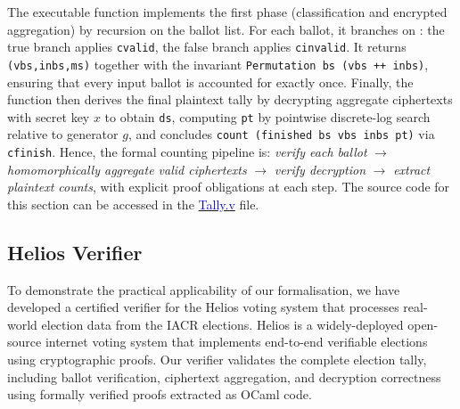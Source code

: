 \documentclass[sigconf,anonymous,review]{acmart}
\begin{document}
The executable function \texttt{} implements the first phase (classification and encrypted aggregation) by recursion on the ballot list. For each ballot, it branches on \texttt{}: the true branch applies \texttt{cvalid}, the false branch applies \texttt{cinvalid}. It returns \texttt{(vbs,inbs,ms)} together with the invariant \texttt{Permutation bs (vbs ++ inbs)}, ensuring that every input ballot is accounted for exactly once. Finally, the function \texttt{} then derives the final plaintext tally by decrypting aggregate ciphertexts with secret key $x$ to obtain \texttt{ds}, computing \texttt{pt} by pointwise discrete-log search relative to generator $g$, and concludes \texttt{count (finished bs vbs inbs pt)} via \texttt{cfinish}. Hence, the formal counting pipeline is: \emph{verify each ballot} $\to$ \emph{homomorphically aggregate valid ciphertexts} $\to$ \emph{verify decryption} $\to$ \emph{extract plaintext counts}, with explicit proof obligations at each step. The source code for this section can be accessed in the \href{https://anonymous.4open.science/r/SigmaProtocol-EBA5/src/Backend/Tally.v}{\textcolor{blue}{Tally.v}} file.


\subsection{Helios Verifier}
To demonstrate the practical applicability of our formalisation, we have developed a certified verifier for 
the Helios voting system that processes real-world election data from the IACR elections. Helios is a 
widely-deployed open-source internet voting system that implements end-to-end verifiable elections using 
cryptographic proofs. Our verifier validates the complete election tally, including ballot verification, ciphertext aggregation, and decryption correctness using formally verified proofs 
extracted as OCaml code. 
\end{document}

